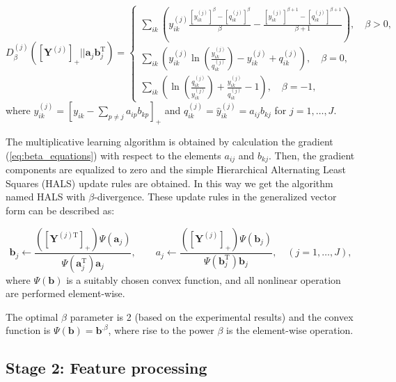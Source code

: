 \documentclass[3p,times]{elsarticle}
\begin{document}
\begin{equation} 
\label{eq:beta_equations}
  D_\beta^{(j)}([\mathbf{Y}^{(j)}]_{+} ||\mathbf{a}_j\mathbf{b}_j^\textrm{T})=
\begin{cases}
\sum_{ik} \left(y_{ik}^{(j)} \frac{\left[y_{ik}^{(j)}\right]^\beta - \left[q_{ik}^{(j)}\right]^{\beta}}{\beta} - \frac{\left[y_{ik}^{(j)}\right]^{\beta+1} - \left[q_{ik}^{(j)}\right]^{\beta + 1}}{\beta+1}  \right), \quad \beta>0,\\
\sum_{ik} \left(y_{ik}^{(j)} \ln \left( \frac{y_{ik}^{(j)}}{q_{ik}^{(j)}} \right) -y_{ik}^{(j)}+q_{ik}^{(j)}  \right), \quad \beta=0,\\
\sum_{ik} \left( \ln \left( \frac{q_{ik}^{(j)}}{y_{ik}^{(j)}} \right)  + \frac{y_{ik}^{(j)}}{q_{ik}^{(j)}} -1 \right),  \quad \beta=-1,
\end{cases}
\end{equation}
where $y_{ik}^{(j)} = \left[ y_{ik} - \sum_{p\neq j} a_{ip}b_{kp} \right]_{+}$ and $q_{ik}^{(j)} = \hat{y}_{ik}^{(j)} = a_{ij}b_{kj}$ for $j=1,\dots,J$.

The multiplicative learning algorithm is obtained by calculation the gradient (\ref{eq:beta_equations}) with respect to the elements $a_{ij}$ and $b_{kj}$.
Then, the gradient components are equalized to zero and the simple Hierarchical Alternating Least Squares (HALS) update rules \cite{cichocki2009nonnegative} are obtained. In this way we get the algorithm named HALS with $\beta$-divergence.
These update rules in the generalized vector form can be described as:

\begin{equation}
  \label{eq:beta_up_rules} 
  \mathbf{b}_j \leftarrow \frac{\left( \left[\mathbf{Y}^{(j)\textrm{T}} \right]_{+}\right)\Psi (\mathbf{a}_j) }{\Psi (\mathbf{a}_j^\textrm{T})\mathbf{a}_j}, \quad \quad a_j \leftarrow \frac{\left( \left[\mathbf{Y}^{(j)} \right]_{+}\right)\Psi (\mathbf{b}_j) }{\Psi (\mathbf{b}_j^\textrm{T})\mathbf{b}_j}, \quad (j=1,\dots,J),
\end{equation}
where $\Psi(\mathbf{b})$ is a suitably chosen convex function, and all nonlinear operation are performed element-wise.

 The optimal $\beta$ parameter is 2 (based on the experimental results) and the convex function is $\Psi(\mathbf{b})=\mathbf{b}^{.\beta}$, where rise to the power $\beta$ is the element-wise operation. 

\subsection{Stage 2: Feature processing}
\end{document}
